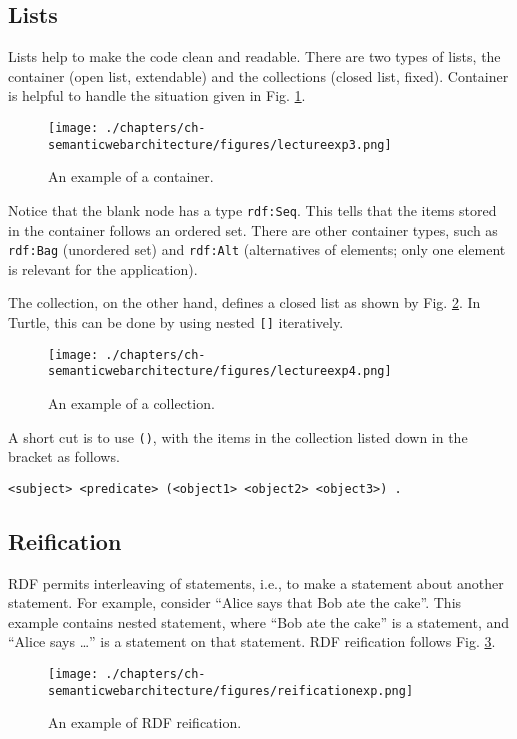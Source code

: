 \subsection{Lists}

Lists help to make the code clean and readable. There are two types of lists, the container (open list, extendable) and the collections (closed list, fixed). Container is helpful to handle the situation given in Fig.  \ref{fig:lectureexp3}.
\begin{figure}[htbp]
	\centering
	\texttt{[image: ./chapters/ch-semanticwebarchitecture/figures/lectureexp3.png]}
	\caption{An example of a container.}
	\label{fig:lectureexp3}
\end{figure}
Notice that the blank node has a type \verb|rdf:Seq|. This tells that the items stored in the container follows an ordered set. There are other container types, such as \verb|rdf:Bag| (unordered set) and \verb|rdf:Alt| (alternatives of elements; only one element is relevant for the application).

The collection, on the other hand, defines a closed list as shown by Fig. \ref{fig:lectureexp4}. In Turtle, this can be done by using nested \verb|[]| iteratively.
\begin{figure}[htbp]
	\centering
	\texttt{[image: ./chapters/ch-semanticwebarchitecture/figures/lectureexp4.png]}
	\caption{An example of a collection.}
	\label{fig:lectureexp4}
\end{figure}
A short cut is to use \verb|()|, with the items in the collection listed down in the bracket as follows.
\begin{lstlisting}
<subject> <predicate> (<object1> <object2> <object3>) .
\end{lstlisting}

\subsection{Reification}

RDF permits interleaving of statements, i.e., to make a statement about another statement. For example, consider ``Alice says that Bob ate the cake''. This example contains nested statement, where ``Bob ate the cake'' is a statement, and ``Alice says \ldots'' is a statement on that statement. RDF reification follows Fig. \ref{fig:reificationexp}.
\begin{figure}[htbp]
	\centering
	\texttt{[image: ./chapters/ch-semanticwebarchitecture/figures/reificationexp.png]}
	\caption{An example of RDF reification.}
	\label{fig:reificationexp}
\end{figure}

